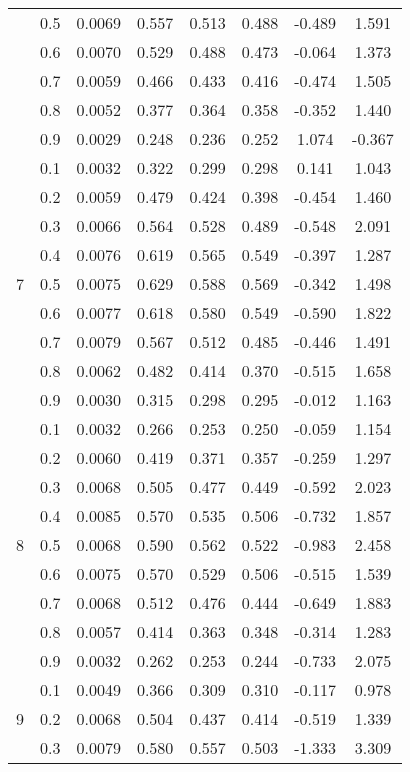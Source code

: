 \documentclass[11pt,a4paper]{report}
\begin{document}
\begin{longtable}{ | c | c || c | c | c | c | c | c | }
 & 0.5 & 0.0069 & 0.557 & 0.513 & 0.488 & -0.489 & 1.591 \\
 & 0.6 & 0.0070 & 0.529 & 0.488 & 0.473 & -0.064 & 1.373 \\
 & 0.7 & 0.0059 & 0.466 & 0.433 & 0.416 & -0.474 & 1.505 \\
 & 0.8 & 0.0052 & 0.377 & 0.364 & 0.358 & -0.352 & 1.440 \\
 & 0.9 & 0.0029 & 0.248 & 0.236 & 0.252 & 1.074 & -0.367 \\
 \hline
\multirow{9}{*}{7} & 0.1 & 0.0032 & 0.322 & 0.299 & 0.298 & 0.141 & 1.043 \\
 & 0.2 & 0.0059 & 0.479 & 0.424 & 0.398 & -0.454 & 1.460 \\
 & 0.3 & 0.0066 & 0.564 & 0.528 & 0.489 & -0.548 & 2.091 \\
 & 0.4 & 0.0076 & 0.619 & 0.565 & 0.549 & -0.397 & 1.287 \\
 & 0.5 & 0.0075 & 0.629 & 0.588 & 0.569 & -0.342 & 1.498 \\
 & 0.6 & 0.0077 & 0.618 & 0.580 & 0.549 & -0.590 & 1.822 \\
 & 0.7 & 0.0079 & 0.567 & 0.512 & 0.485 & -0.446 & 1.491 \\
 & 0.8 & 0.0062 & 0.482 & 0.414 & 0.370 & -0.515 & 1.658 \\
 & 0.9 & 0.0030 & 0.315 & 0.298 & 0.295 & -0.012 & 1.163 \\
 \hline
\multirow{9}{*}{8} & 0.1 & 0.0032 & 0.266 & 0.253 & 0.250 & -0.059 & 1.154 \\
 & 0.2 & 0.0060 & 0.419 & 0.371 & 0.357 & -0.259 & 1.297 \\
 & 0.3 & 0.0068 & 0.505 & 0.477 & 0.449 & -0.592 & 2.023 \\
 & 0.4 & 0.0085 & 0.570 & 0.535 & 0.506 & -0.732 & 1.857 \\
 & 0.5 & 0.0068 & 0.590 & 0.562 & 0.522 & -0.983 & 2.458 \\
 & 0.6 & 0.0075 & 0.570 & 0.529 & 0.506 & -0.515 & 1.539 \\
 & 0.7 & 0.0068 & 0.512 & 0.476 & 0.444 & -0.649 & 1.883 \\
 & 0.8 & 0.0057 & 0.414 & 0.363 & 0.348 & -0.314 & 1.283 \\
 & 0.9 & 0.0032 & 0.262 & 0.253 & 0.244 & -0.733 & 2.075 \\
 \hline
\multirow{9}{*}{9} & 0.1 & 0.0049 & 0.366 & 0.309 & 0.310 & -0.117 & 0.978 \\
 & 0.2 & 0.0068 & 0.504 & 0.437 & 0.414 & -0.519 & 1.339 \\
 & 0.3 & 0.0079 & 0.580 & 0.557 & 0.503 & -1.333 & 3.309 \\

\end{longtable}
\end{document}
